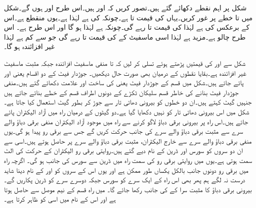 شکل  پر اہم نقطے دکھائے گئے ہیں۔تصور کریں کہ  اور  ہیں۔اس طرح  اور  ہوں  گے۔شکل میں  تا  خطے پر غور کریں۔یہاں  کی قیمت  تا  ہے۔چونکہ  کی  ہے  لہٰذا  ہے۔یوں  منقطع ہے۔اس کے برعکس  کی  ہے لہٰذا  کی قیمت  تا  رہے گی۔چونکہ  ہے لہٰذا  ہو گا اور اس طرح  ہے۔ اس طرح   چالو ہے۔مزید  ہے لہٰذا اسی ماسفیٹ کے   کی قیمت  تا  رہے گی  جو  سے کم ہے لہٰذا  غیر افزائندہ ہو گا۔ 

شکل  سے  اور   کی قیمتیں پڑھتے ہوئے تسلی کر لیں کہ  تا  منفی ماسفیٹ افزائندہ جبکہ مثبت ماسفیٹ غیر افزائندہ ہے۔بقایا نقطوں کے درمیان بھی صورت حال دیکھیں۔ 
جوڑدار فیٹ کے دو اقسام یعنی  اور  پائے جاتے ہیں۔شکل  میں  قسم کے جوڑدار فیٹ یعنی  کی ساخت اور علامت دکھائے گئے ہیں۔منفی جوڑدار فیٹ بنانے کی خاطر  قسم سلیکان ٹکڑے کے دونوں اطراف  قسم کے خطے بنائے جاتے ہیں جنہیں گیٹ کہتے ہیں۔ان دو خطوں کو بیرونی دھاتی تار سے جوڑ کر بطور گیٹ  استعمال کیا جاتا ہے۔شکل میں اس بیرونی دھاتی تار کو نہیں دکھایا گیا ہے۔دو گیٹوں کے درمیان راہ میں آزاد الیکٹران پائے جاتے ہیں۔اس راہ پر بیرونی برقی دباؤ  لاگو کرنے سے راہ میں موجود آزاد الیکٹران منفی برقی دباؤ والے سرے سے مثبت برقی دباؤ والے سرے کی جانب حرکت کریں گے جس سے برقی رو  پیدا ہو گی۔یوں منفی برقی دباؤ والے سرے سے خارج الیکٹران، مثبت برقی دباؤ والے سرے پر حاصل ہوتے ہیں۔اسی سے ان دو سروں کو سورس  اور ڈرین  کے نام دیے گئے ہیں۔روایتی برقی رو الیکٹران کے حرکت کی الٹ سمت ہوتی ہے۔یوں  میں روایتی برقی رو کی سمت راہ میں ڈرین سے سورس کی جانب ہو گی۔ اگرچہ راہ میں برقی رو دونوں جانب بالکل یکساں طور ممکن ہے اور یوں اس کے سروں کو  اور  کے نام دینا شاید درست نہ لگے ہم پھر بھی اس راہ کے ایک سرے کو سورس  جبکہ دوسرے سرے کو ڈرین  پکاریں گے۔بیرونی برقی دباؤ کا مثبت سرا  کے  کی جانب رکھا جائے گا۔ میں راہ  قسم کے نیم موصل سے حاصل ہوتا ہے اور اس کے نام میں  اسی  کو ظاہر کرتا ہے۔

